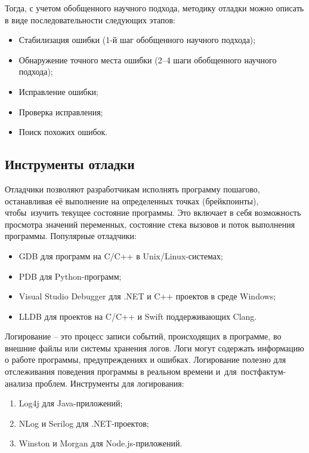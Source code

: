 \documentclass{ou}
\begin{document}
Тогда, с учетом обобщенного научного подхода, методику отладки можно описать в виде последовательности следующих этапов:
\begin{itemize}[label=-, leftmargin=0em, itemindent=3.35em, nosep]
\item Стабилизация ошибки (1-й шаг обобщенного научного подхода);
\item Обнаружение точного места ошибки (2--4 шаги обобщенного научного подхода);
\item Исправление ошибки;
\item Проверка исправления;
\item Поиск похожих ошибок.
\end{itemize}
\subsection{Инструменты отладки}
Отладчики позволяют разработчикам исполнять программу пошагово, останавливая её выполнение на определенных точках (брейкпоинты), чтобы~изучить текущее состояние программы. Это включает в себя возможность просмотра значений переменных, состояние стека вызовов и поток выполнения программы. Популярные отладчики:
\begin{itemize}[label=-, leftmargin=0em, itemindent=3.35em, nosep]
\item GDB для программ на C/C++ в Unix/Linux-системах;
\item PDB для Python-программ;
\item Visual Studio Debugger для .NET и C++ проектов в среде Windows;
\item LLDB для проектов на C/C++ и Swift поддерживающих Clang.
\end{itemize}

Логирование -- это процесс записи событий, происходящих в программе, во внешние файлы или системы хранения логов. Логи могут содержать информацию о работе программы, предупреждениях и ошибках. Логирование полезно для отслеживания поведения программы в реальном времени и~для~постфактум-анализа проблем. Инструменты для логирования:
\begin{enumerate}[leftmargin=0em, itemindent=3.75em, nosep, label=\arabic*)]
\item Log4j для Java-приложений;
\item NLog и Serilog для .NET-проектов;
\item Winston и Morgan для Node.js-приложений.
\end{enumerate}
\end{document}
